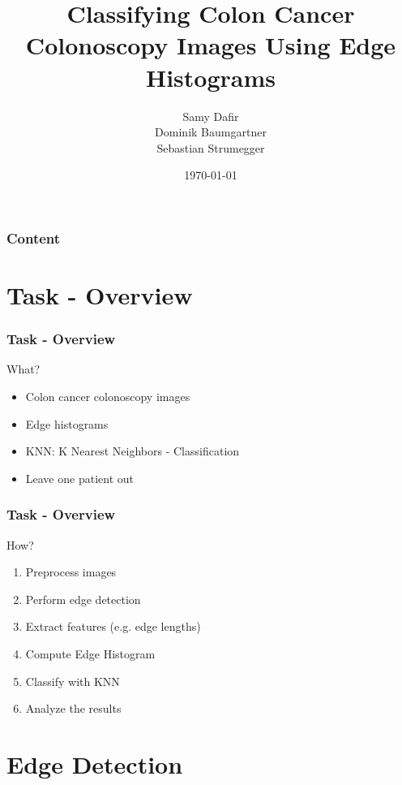 \documentclass{beamer}
\title{Classifying Colon Cancer Colonoscopy Images Using Edge Histograms}
\author[]{Samy Dafir \\Dominik Baumgartner \\Sebastian Strumegger}
\date{\today}
\begin{document}
\frame{\titlepage}

\begin{frame}
    \frametitle{Content} 
    \tableofcontents 
\end{frame}

\section{Task - Overview}
\begin{frame}
	\frametitle{Task - Overview}
    \begin{block}{What?}
	    \begin{itemize}
		    \item Colon cancer colonoscopy images
		    \item Edge histograms
            \item KNN: K Nearest Neighbors - Classification
            \item Leave one patient out
	    \end{itemize}
    \end{block}
\end{frame}

\begin{frame}
	\frametitle{Task - Overview}
    \begin{block}{How?}
	    \begin{enumerate}
		    \item Preprocess images
		    \item Perform edge detection
		    \item Extract features (e.g. edge lengths)
            \item Compute Edge Histogram
            \item Classify with KNN
            \item Analyze the results
	    \end{enumerate}
    \end{block}
\end{frame}

\section{Edge Detection}
\end{document}
